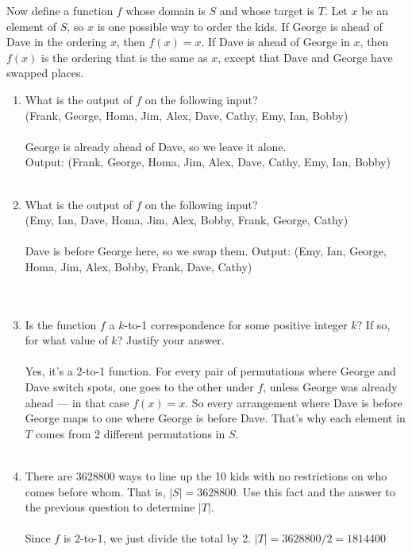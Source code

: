 \documentclass{amsart}
\theoremstyle{definition}
\theoremstyle{Exercise}
\theoremstyle{remark}
\theoremstyle{rule}
\numberwithin{equation}{section}
\begin{document}
Now define a function $f$ whose domain is $S$ and whose target is $T$. Let $x$ be an element of $S$, so $x$ is one possible way to order the kids. If George is ahead of Dave in the ordering $x$, then $f(x) = x$. If Dave is ahead of George in $x$, then $f(x)$ is the ordering that is the same as $x$, except that Dave and George have swapped places.\\
\begin{enumerate}[label=(\alph*)]

  \item What is the output of $f$ on the following input?\\
  (Frank, George, Homa, Jim, Alex, Dave, Cathy, Emy, Ian, Bobby)\\\\
George is already ahead of Dave, so we leave it alone.\\
Output: (Frank, George, Homa, Jim, Alex, Dave, Cathy, Emy, Ian, Bobby)
\\\\

  \item What is the output of $f$ on the following input?\\
(Emy, Ian, Dave, Homa, Jim, Alex, Bobby, Frank, George, Cathy)\\\\
Dave is before George here, so we swap them.
Output: (Emy, Ian, George, Homa, Jim, Alex, Bobby, Frank, Dave, Cathy)\\
\\\\

  \item Is the function $f$ a $k$-to-1 correspondence for some positive integer $k$? If so, for what value of $k$? Justify your answer.\\\\
Yes, it’s a 2-to-1 function. For every pair of permutations where George and Dave switch spots, one goes to the other under $f$, unless George was already ahead — in that case $f(x) = x$. So every arrangement where Dave is before George maps to one where George is before Dave. That’s why each element in $T$ comes from 2 different permutations in $S$.
\\\\

  \item There are 3628800 ways to line up the 10 kids with no restrictions on who comes before whom. That is, $|S| =3628800$. Use this fact and the answer to the previous question to determine $|T|$.\\\\
Since $f$ is 2-to-1, we just divide the total by 2.
$|T| = 3628800 / 2 = 1814400$
\\\\
\end{enumerate}
\end{document}
